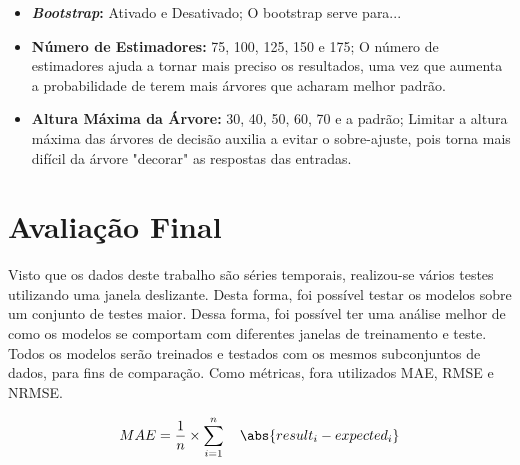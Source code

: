 \begin{itemize}
    \item \textbf{\textit{Bootstrap}:} Ativado e Desativado;
    O bootstrap serve para...
    \item \textbf{Número de Estimadores:} 75, 100, 125, 150 e 175;
    O número de estimadores ajuda a tornar mais preciso os resultados, uma vez que aumenta a probabilidade de terem mais árvores que acharam melhor padrão.
    \item \textbf{Altura Máxima da Árvore:} 30, 40, 50, 60, 70 e a padrão;
    Limitar a altura máxima das árvores de decisão auxilia a evitar o sobre-ajuste, pois torna mais difícil da árvore "decorar" as respostas das entradas.
    
    
\end{itemize}

\section{Avaliação Final}




Visto que os dados deste trabalho são séries temporais, realizou-se vários testes utilizando uma janela deslizante. Desta forma, foi possível testar os modelos sobre um conjunto de testes maior. Dessa forma, foi possível ter uma análise melhor de como os modelos se comportam com diferentes janelas de treinamento e teste. Todos os modelos serão treinados e testados com os mesmos subconjuntos de dados, para fins de comparação. Como métricas, fora utilizados \acrshort{MAE}, \acrshort{RMSE} e \acrshort{NRMSE}. 

\begin{equation}
MAE = \frac{1}{n} \times \sum_{i=1}^{n} \quad \abs{result_i - expected_i}
\end{equation}


